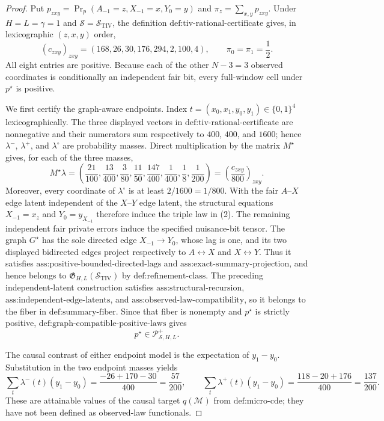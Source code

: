 \documentclass{article}
\begin{document}
\begin{proof}
Put \(p_{zxy}=\Pr_p(A_{-1}=z,X_{-1}=x,Y_0=y)\) and \(\pi_z=\sum_{x,y}p_{zxy}\).  Under \(H=L=\gamma=1\) and \(\mathcal S=\mathcal S_{\mathrm{TIV}}\), the definition \(\text{def:tiv-rational-certificate}\) gives, in lexicographic \((z,x,y)\) order,
\[
(c_{zxy})_{zxy}=(168,26,30,176,294,2,100,4),
\qquad
\pi_0=\pi_1=\frac12.
\tag{1}
\]
All eight entries are positive.  Because each of the other \(N-3=3\) observed coordinates is conditionally an independent fair bit, every full-window cell under \(p^{\star}\) is positive.

We first certify the graph-aware endpoints.  Index \(t=(x_0,x_1,y_0,y_1)\in\{0,1\}^4\) lexicographically.  The three displayed vectors in \(\text{def:tiv-rational-certificate}\) are nonnegative and their numerators sum respectively to \(400\), \(400\), and \(1600\); hence \(\lambda^-\), \(\lambda^+\), and \(\lambda^{\circ}\) are probability masses.  Direct multiplication by the matrix \(M^{\star}\) gives, for each of the three masses,
\[
M^{\star}\lambda
=\left(
\frac{21}{100},\frac{13}{400},\frac{3}{80},\frac{11}{50},
\frac{147}{400},\frac{1}{400},\frac18,\frac{1}{200}
\right)
=\left(\frac{c_{zxy}}{800}\right)_{zxy}.
\tag{2}
\]
Moreover, every coordinate of \(\lambda^{\circ}\) is at least \(2/1600=1/800\).  With the fair \(A\)--\(X\) edge latent independent of the \(X\)--\(Y\) edge latent, the structural equations \(X_{-1}=x_z\) and \(Y_0=y_{X_{-1}}\) therefore induce the triple law in (2).  The remaining independent fair private errors induce the specified nuisance-bit tensor.  The graph \(G^{\star}\) has the sole directed edge \(X_{-1}\to Y_0\), whose lag is one, and its two displayed bidirected edges project respectively to \(A\leftrightarrow X\) and \(X\leftrightarrow Y\).  Thus it satisfies \(\text{ass:positive-bounded-directed-lags}\) and \(\text{ass:exact-summary-projection}\), and hence belongs to \(\mathfrak G_{H,L}(\mathcal S_{\mathrm{TIV}})\) by \(\text{def:refinement-class}\).  The preceding independent-latent construction satisfies \(\text{ass:structural-recursion}\), \(\text{ass:independent-edge-latents}\), and \(\text{ass:observed-law-compatibility}\), so it belongs to the fiber in \(\text{def:summary-fiber}\).  Since that fiber is nonempty and \(p^{\star}\) is strictly positive, \(\text{def:graph-compatible-positive-laws}\) gives
\[
p^{\star}\in\mathcal P_{\mathcal S,H,L}^{+}.
\tag{3}
\]

The causal contrast of either endpoint model is the expectation of \(y_1-y_0\).  Substitution in the two endpoint masses yields
\[
\sum_t\lambda^-(t)(y_1-y_0)
=\frac{-26+170-30}{400}=\frac{57}{200},
\qquad
\sum_t\lambda^+(t)(y_1-y_0)
=\frac{118-20+176}{400}=\frac{137}{200}.
\tag{4}
\]
These are attainable values of the causal target \(q(\mathcal M)\) from \(\text{def:micro-cde}\); they have not been defined as observed-law functionals.


\end{proof}
\end{document}
